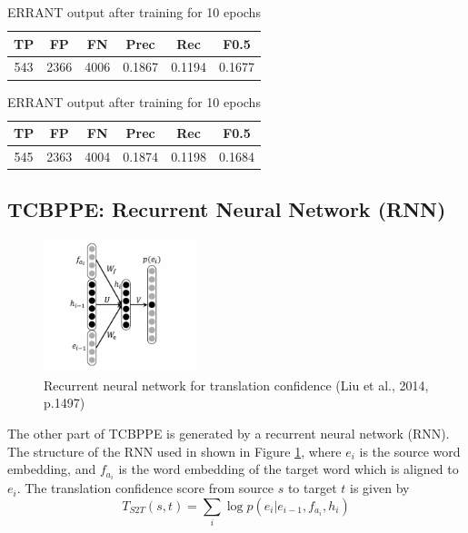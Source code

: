 \documentclass[12pt,a4paper,twoside,openright]{report}
\begin{document}
\begin{table}[ht]
    \centering
    \begin{tabular}{ |c|c|c|c|c|c| } 
     \hline
     TP & FP & FN & Prec & Rec & F0.5 \\ [0.5ex] 
     \hline
     543 & 2366 & 4006 & 0.1867 & 0.1194 & 0.1677 \\ 
     \hline
    \end{tabular}
    \caption{ERRANT output after training for 5 epochs}
    \label{table:sparse_5}
    
    \vspace{1em}
    
    \begin{tabular}{ |c|c|c|c|c|c| } 
     \hline
     TP & FP & FN & Prec & Rec & F0.5 \\ [0.5ex] 
     \hline
     545 & 2363 & 4004 & 0.1874 & 0.1198 & 0.1684 \\ 
     \hline
    \end{tabular}
    \caption{ERRANT output after training for 10 epochs}
    \label{table:sparse_10}
\end{table}

\subsection{TCBPPE: Recurrent Neural Network (RNN)} \label{section:TCBPPE_rnn}

\begin{figure}[ht]
\centering
\includegraphics[width=0.4\textwidth]{images/rnn_ppe.png}
\caption{Recurrent neural network for translation confidence (Liu et al., 2014, p.1497)}
\label{fig:rnn_ppe}
\end{figure}

The other part of TCBPPE is generated by a recurrent neural network (RNN). The structure of the RNN used in shown in Figure \ref{fig:rnn_ppe}, where $e_i$ is the source word embedding, and $f_{a_i}$ is the word embedding of the target word which is aligned to $e_i$. The translation confidence score from source $s$ to target $t$ is given by
\[ T_{S2T}(s, t) = \sum_{i} \log p(e_i|e_{i-1}, f_{a_i}, h_i)\]
\end{document}
